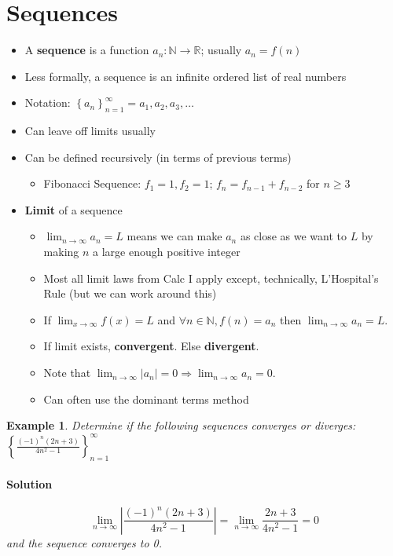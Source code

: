 \documentclass[letterpaper, 11pt, openany]{book}
\theoremstyle{mytheoremstyle}
\theoremstyle{myexamplestyle}
\newtheorem{example}{Example}[section]
\newenvironment{solution}{\paragraph{\sffamily \smaller \fontseries{b}\selectfont Solution}}{\hfill\faSquare}
\begin{document}
\section{Sequences}
\begin{itemize}
    \item A \textbf{sequence} is a function $a_{n}: \mathbb{N} \rightarrow \mathbb{R}$; usually $a_{n} = f(n)$
    \item Less formally, a sequence is an infinite ordered list of real numbers
    \item Notation: $\left\{a_{n}\right\}_{n=1}^{\infty} = a_{1}, a_{2}, a_{3}, \ldots$
    \item Can leave off limits usually
    \item Can be defined recursively (in terms of previous terms)
    \begin{itemize}
        \item Fibonacci Sequence: $f_{1} = 1, f_{2} = 1$; $f_{n} = f_{n-1} + f_{n-2}$ for $n \geq 3$
    \end{itemize}
    \item \textbf{Limit} of a sequence
    \begin{itemize}
        \item $\displaystyle \lim_{n \to \infty} a_{n} = L$ means we can make $a_{n}$ as close as we want to $L$ by making $n$ a large enough positive integer
        \item Most all limit laws from Calc I apply except, technically, L'Hospital's Rule (but we can work around this)
        \item If $\displaystyle \lim_{x \to \infty} f(x) = L$ and $ \forall n \in \mathbb{N}, f(n) = a_{n}$ then $\lim_{n \to \infty} a_{n} = L$.
        \item If limit exists, \textbf{convergent}. Else \textbf{divergent}.
        \item Note that $\displaystyle \lim_{n \to \infty} |a_{n}| = 0 \Rightarrow \lim_{n \to \infty} a_{n} = 0$.
        \item Can often use the dominant terms method
    \end{itemize}    
\end{itemize}

\begin{example}\label{e:seqalt}
    Determine if the following sequences converges or diverges: $\displaystyle \left\{ \frac{(-1)^{n}(2n+3)}{4n^{2}-1}\right\}_{n = 1}^{\infty}$
    
    \begin{solution}
        \[\lim_{n \to \infty} \left| \frac{(-1)^{n}(2n+3)}{4n^{2}-1} \right| = \lim_{n \to \infty} \frac{2n+3}{4n^{2}-1} = 0\]
        and the sequence converges to 0.
    \end{solution}
\end{example}
\end{document}
